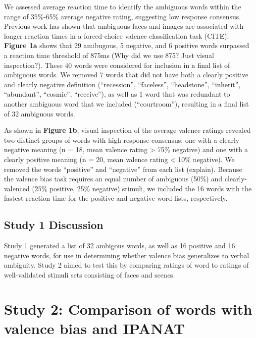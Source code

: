\documentclass[man]{apa6}
\begin{document}
We assessed average reaction time to identify the ambiguous words within the range of 35\%-65\% average negative rating, suggesting low response consensus. Previous work has shown that ambiguous faces and images are associated with longer reaction times in a forced-choice valence classification task (CITE). \textbf{Figure 1a} shows that 29 amibugous, 5 negative, and 6 positive words surpassed a reaction time threshold of 875ms (Why did we use 875? Just visual inspection?). These 40 words were considered for inclusion in a final list of ambiguous words. We removed 7 words that did not have both a clearly positive and clearly negative definition (\enquote{recession}, \enquote{faceless}, \enquote{headstone}, \enquote{inherit}, \enquote{abundant}, \enquote{cosmic}, \enquote{receive}), as well as 1 word that was redundant to another ambiguous word that we included (\enquote{courtroom}), resulting in a final list of 32 ambiguous words.

As shown in \textbf{Figure 1b}, visual inspection of the average valence ratings revealed two distinct groups of words with high response consensus: one with a clearly negative meaning (n = 18, mean valence rating \textgreater{} 75\% negative) and one with a clearly positive meaning (n = 20, mean valence rating \textless{} 10\% negative). We removed the words \enquote{positive} and \enquote{negative} from each list (explain). Because the valence bias task requires an equal number of ambiguous (50\%) and clearly-valenced (25\% positive, 25\% negative) stimuli, we included the 16 words with the fastest reaction time for the positive and negative word lists, respectively.

\hypertarget{study-1-discussion}{%
\subsection{Study 1 Discussion}\label{study-1-discussion}}

Study 1 generated a list of 32 ambigous words, as well as 16 positive and 16 negative words, for use in determining whether valence bias generalizes to verbal ambiguity. Study 2 aimed to test this by comparing ratings of word to ratings of well-validated stimuli sets consisting of faces and scenes.

\hypertarget{study-2-comparison-of-words-with-valence-bias-and-ipanat}{%
\section{Study 2: Comparison of words with valence bias and IPANAT}\label{study-2-comparison-of-words-with-valence-bias-and-ipanat}}
\end{document}
